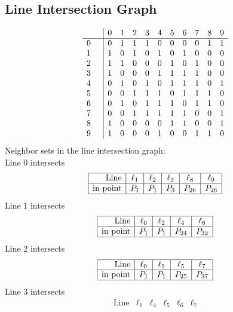\documentclass{article}
\begin{document}
{\subsection*{Line Intersection Graph}
{\arraycolsep=1pt
$$
\begin{array}{rr|*{10}r}
 &  & 0 & 1 & 2 & 3 & 4 & 5 & 6 & 7 & 8 & 9\\
\hline
0 &  & 0 & 1 & 1 & 1 & 0 & 0 & 0 & 0 & 1 & 1\\
1 &  & 1 & 0 & 1 & 0 & 1 & 0 & 1 & 0 & 0 & 0\\
2 &  & 1 & 1 & 0 & 0 & 0 & 1 & 0 & 1 & 0 & 0\\
3 &  & 1 & 0 & 0 & 0 & 1 & 1 & 1 & 1 & 0 & 0\\
4 &  & 0 & 1 & 0 & 1 & 0 & 1 & 1 & 1 & 0 & 1\\
5 &  & 0 & 0 & 1 & 1 & 1 & 0 & 1 & 1 & 1 & 0\\
6 &  & 0 & 1 & 0 & 1 & 1 & 1 & 0 & 1 & 1 & 0\\
7 &  & 0 & 0 & 1 & 1 & 1 & 1 & 1 & 0 & 0 & 1\\
8 &  & 1 & 0 & 0 & 0 & 0 & 1 & 1 & 0 & 0 & 1\\
9 &  & 1 & 0 & 0 & 0 & 1 & 0 & 0 & 1 & 1 & 0\\
\end{array}
$$
}%
Neighbor sets in the line intersection graph:\\
Line 0 intersects 
$$
\begin{array}{|r*{5}{|c}|}
\hline
\mbox{Line}  & \ell_{1} & \ell_{2} & \ell_{3} & \ell_{8} & \ell_{9}\\
\hline
\mbox{in point}  & P_{1} & P_{1} & P_{3} & P_{26} & P_{26}\\
\hline
\end{array}
$$
Line 1 intersects 
$$
\begin{array}{|r*{4}{|c}|}
\hline
\mbox{Line}  & \ell_{0} & \ell_{2} & \ell_{4} & \ell_{6}\\
\hline
\mbox{in point}  & P_{1} & P_{1} & P_{24} & P_{32}\\
\hline
\end{array}
$$
Line 2 intersects 
$$
\begin{array}{|r*{4}{|c}|}
\hline
\mbox{Line}  & \ell_{0} & \ell_{1} & \ell_{5} & \ell_{7}\\
\hline
\mbox{in point}  & P_{1} & P_{1} & P_{25} & P_{37}\\
\hline
\end{array}
$$
Line 3 intersects 
$$
\begin{array}{|r*{5}{|c}|}
\hline
\mbox{Line}  & \ell_{0} & \ell_{4} & \ell_{5} & \ell_{6} & \ell_{7}\\

\end{array}$$}
\end{document}
